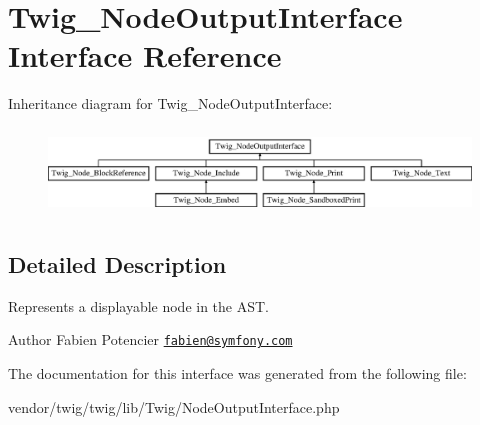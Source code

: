 \hypertarget{interfaceTwig__NodeOutputInterface}{}\section{Twig\+\_\+\+Node\+Output\+Interface Interface Reference}
\label{interfaceTwig__NodeOutputInterface}
Inheritance diagram for Twig\+\_\+\+Node\+Output\+Interface\+:\begin{figure}[H]
\begin{center}
\leavevmode
\includegraphics[height=2.333333cm]{interfaceTwig__NodeOutputInterface}
\end{center}
\end{figure}


\subsection{Detailed Description}
Represents a displayable node in the A\+ST.

\begin{DoxyAuthor}{Author}
Fabien Potencier \href{mailto:fabien@symfony.com}{\tt fabien@symfony.\+com} 
\end{DoxyAuthor}


The documentation for this interface was generated from the following file\+:\begin{DoxyCompactItemize}
\item 
vendor/twig/twig/lib/\+Twig/Node\+Output\+Interface.\+php\end{DoxyCompactItemize}
